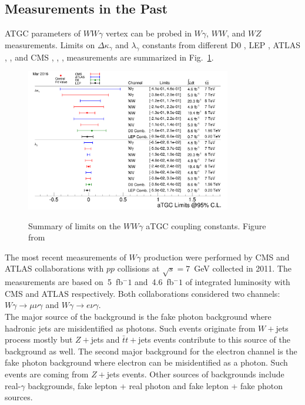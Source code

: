 \subsection{Measurements in the Past}

ATGC parameters of $WW\gamma$ vertex can be probed in $W\gamma$, $WW$, and $WZ$ measurements. Limits on $\Delta \kappa_\gamma$ and $\lambda_\gamma$ constants from different D0 \cite{ref_D0_aTGC_comb}, LEP \cite{ref_LEP_aTGC_comb}, ATLAS \cite{ref_7TeV_ATLAS}, \cite{ref_ATLAS_WW_8TeV}, \cite{ref_ATLAS_VW_8TeV} and CMS \cite{ref_7TeV_CMS}, \cite{ref_CMS_WW_7TeV}, \cite{ref_CMS_WW_8TeV}, \cite{ref_CMS_VW_7TeV} measurements are summarized in Fig.~\ref{fig:aTGC_cg}.\\ 

\begin{figure}[htb]
  \begin{center}
    {\includegraphics[width=0.80\textwidth]{../figs/WgAbout/aTGC_cg.png}}
    \caption{Summary of limits on the $WW\gamma$ aTGC coupling constants. Figure from \cite{ref_twiki_SMP_ATGC}}
    \label{fig:aTGC_cg}
  \end{center}
\end{figure}

The most recent measurements of $W\gamma$ production were performed by CMS \cite{ref_7TeV_CMS} and ATLAS \cite{ref_7TeV_ATLAS} collaborations with $pp$ collisions at $\sqrt{s}=7$~GeV collected in 2011. The measurements are based on~5~fb$^-1$ and~4.6~fb$^-1$ of integrated luminosity with CMS and ATLAS respectively. Both collaborations considered two channels: $W\gamma\rightarrow\mu\nu\gamma$ and $W\gamma\rightarrow e\nu\gamma$.\\

The major source of the background is the fake photon background where hadronic jets are misidentified as photons. Such events originate from $W+$jets process mostly but $Z+$jets and $\bar{t}t+$jets events contribute to this source of the background as well. The second major background for the electron channel is the fake photon background where electron can be misidentified as a photon.  Such events are coming from $Z+$jets events. Other sources of backgrounds include real-$\gamma$ backgrounds, fake lepton + real photon and fake lepton + fake photon sources.\\

